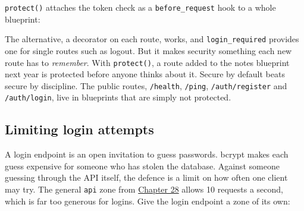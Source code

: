 \texttt{protect()} attaches the token check as a \texttt{before\_request} hook to a whole blueprint:

\begin{codebox}[short]

\begin{Shaded}
\begin{Highlighting}[]

\OperatorTok{=}\NormalTok{, }\OperatorTok{=}\NormalTok{)}
\end{Highlighting}
\end{Shaded}

\end{codebox}

\noindent{}The alternative, a decorator on each route, works, and \texttt{login\_required} provides one for single routes such as logout. But it makes security something each new route has to \emph{remember}. With \texttt{protect()}, a route added to the notes blueprint next year is protected before anyone thinks about it. Secure by default beats secure by discipline. The public routes, \texttt{/health}, \texttt{/ping}, \texttt{/auth/register} and \texttt{/auth/login}, live in blueprints that are simply not protected.

\subsection*{Limiting login attempts}\label{38-security:limiting-login-attempts}

A login endpoint is an open invitation to guess passwords. bcrypt makes each guess expensive for someone who has stolen the database. Against someone guessing through the API itself, the defence is a limit on how often one client may try. The general \texttt{api} zone from \hyperref[ch:28-traffic-routing]{Chapter 28} allows 10 requests a second, which is far too generous for logins. Give the login endpoint a zone of its own:

\begin{codebox}[short]

\begin{Shaded}
\begin{Highlighting}[]
\end{Highlighting}
\end{Shaded}

\end{codebox}

